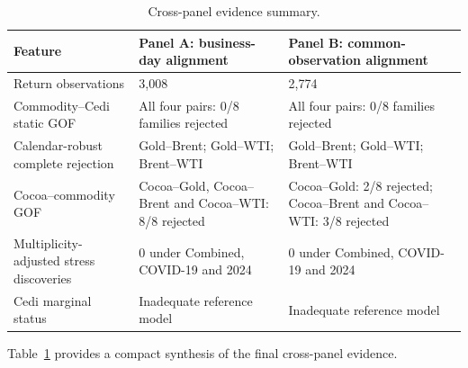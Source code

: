 \begin{table}[htbp]
\centering
\caption{Cross-panel evidence summary.}
\label{tab:crosspanel-summary}
\small
\begin{tabularx}{\textwidth}{>{\raggedright\arraybackslash}p{}XX}
\toprule
\textbf{Feature} & \textbf{Panel A: business-day alignment} & \textbf{Panel B: common-observation alignment} \\
\midrule
Return observations & 3,008 & 2,774 \\
Commodity--Cedi static GOF & All four pairs: 0/8 families rejected & All four pairs: 0/8 families rejected \\
Calendar-robust complete rejection & Gold--Brent; Gold--WTI; Brent--WTI & Gold--Brent; Gold--WTI; Brent--WTI \\
Cocoa--commodity GOF & Cocoa--Gold, Cocoa--Brent and Cocoa--WTI: 8/8 rejected & Cocoa--Gold: 2/8 rejected; Cocoa--Brent and Cocoa--WTI: 3/8 rejected \\
Multiplicity-adjusted stress discoveries & 0 under Combined, COVID-19 and 2024 & 0 under Combined, COVID-19 and 2024 \\
Cedi marginal status & Inadequate reference model & Inadequate reference model \\
\bottomrule
\end{tabularx}
\end{table}

Table~\ref{tab:crosspanel-summary} provides a compact synthesis of the final cross-panel evidence.

